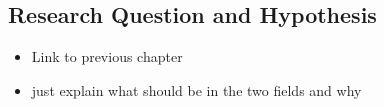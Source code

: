 \subsection{Research Question and Hypothesis}


\begin{itemize}
	\item Link to previous chapter
	\item just explain what should be in the two fields and why
\end{itemize}